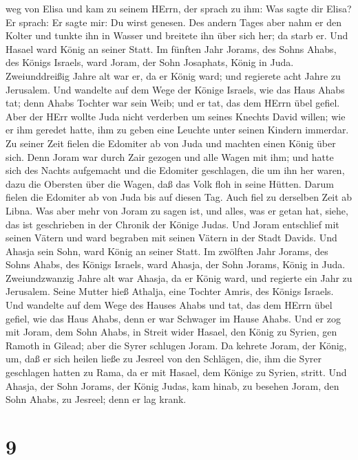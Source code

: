 weg von Elisa und kam zu seinem HErrn, der sprach zu ihm: Was sagte dir
Elisa? Er sprach: Er sagte mir: Du wirst genesen.  Des
andern Tages aber nahm er den Kolter und tunkte ihn in Wasser und
breitete ihn über sich her; da starb er. Und Hasael ward König an seiner
Statt.  Im fünften Jahr Jorams, des Sohns Ahabs, des Königs
Israels, ward Joram, der Sohn Josaphats, König in Juda. 
Zweiunddreißig Jahre alt war er, da er König ward; und regierete acht
Jahre zu Jerusalem.  Und wandelte auf dem Wege der Könige
Israels, wie das Haus Ahabs tat; denn Ahabs Tochter war sein Weib; und
er tat, das dem HErrn übel gefiel.  Aber der HErr wollte
Juda nicht verderben um seines Knechts David willen; wie er ihm geredet
hatte, ihm zu geben eine Leuchte unter seinen Kindern immerdar.
 Zu seiner Zeit fielen die Edomiter ab von Juda und machten
einen König über sich.  Denn Joram war durch Zair gezogen
und alle Wagen mit ihm; und hatte sich des Nachts aufgemacht und die
Edomiter geschlagen, die um ihn her waren, dazu die Obersten über die
Wagen, daß das Volk floh in seine Hütten.  Darum fielen die
Edomiter ab von Juda bis auf diesen Tag. Auch fiel zu derselben Zeit ab
Libna.  Was aber mehr von Joram zu sagen ist, und alles,
was er getan hat, siehe, das ist geschrieben in der Chronik der Könige
Judas.  Und Joram entschlief mit seinen Vätern und ward
begraben mit seinen Vätern in der Stadt Davids. Und Ahasja sein Sohn,
ward König an seiner Statt.  Im zwölften Jahr Jorams, des
Sohns Ahabs, des Königs Israels, ward Ahasja, der Sohn Jorams, König in
Juda.  Zweiundzwanzig Jahre alt war Ahasja, da er König
ward, und regierte ein Jahr zu Jerusalem. Seine Mutter hieß Athalja,
eine Tochter Amris, des Königs Israels.  Und wandelte auf
dem Wege des Hauses Ahabs und tat, das dem HErrn übel gefiel, wie das
Haus Ahabs, denn er war Schwager im Hause Ahabs.  Und er
zog mit Joram, dem Sohn Ahabs, in Streit wider Hasael, den König zu
Syrien, gen Ramoth in Gilead; aber die Syrer schlugen Joram.
 Da kehrete Joram, der König, um, daß er sich heilen ließe
zu Jesreel von den Schlägen, die, ihm die Syrer geschlagen hatten zu
Rama, da er mit Hasael, dem Könige zu Syrien, stritt. Und Ahasja, der
Sohn Jorams, der König Judas, kam hinab, zu besehen Joram, den Sohn
Ahabs, zu Jesreel; denn er lag krank.

\hypertarget{section-8}{%
\section{9}\label{section-8}}

